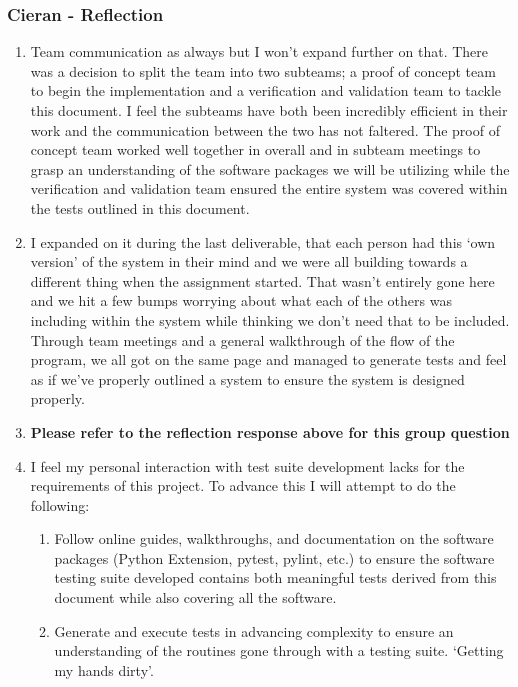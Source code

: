 \documentclass[12pt, titlepage]{article}
\begin{document}
\subsubsection*{Cieran - Reflection}
\begin{enumerate}
  \item Team communication as always but I won’t expand further on that. There was a decision to split the team into two subteams; a proof of concept team to begin the implementation and a verification and validation team to tackle this document. I feel the subteams have both been incredibly efficient in their work and the communication between the two has not faltered. The proof of concept team worked well together in overall and in subteam meetings to grasp an understanding of the software packages we will be utilizing while the verification and validation team ensured the entire system was covered within the tests outlined in this document.
  \item I expanded on it during the last deliverable, that each person had this ‘own version’ of the system in their mind and we were all building towards a different thing when the assignment started. That wasn’t entirely gone here and we hit a few bumps worrying about what each of the others was including within the system while thinking we don’t need that to be included. Through team meetings and a general walkthrough of the flow of the program, we all got on the same page and managed to generate tests and feel as if we’ve properly outlined a system to ensure the system is designed properly.
  \item \textbf{Please refer to the reflection response above for this group question}
  \item I feel my personal interaction with test suite development lacks for the requirements of this project. To advance this I will attempt to do the following:
  \begin{enumerate}
    \item Follow online guides, walkthroughs, and documentation on the software packages (Python Extension, pytest, pylint, etc.) to ensure the software testing suite developed contains both meaningful tests derived from this document while also covering all the software.
    \item Generate and execute tests in advancing complexity to ensure an understanding of the routines gone through with a testing suite. ‘Getting my hands dirty’.
  \end{enumerate}
\end{enumerate}
\end{document}
